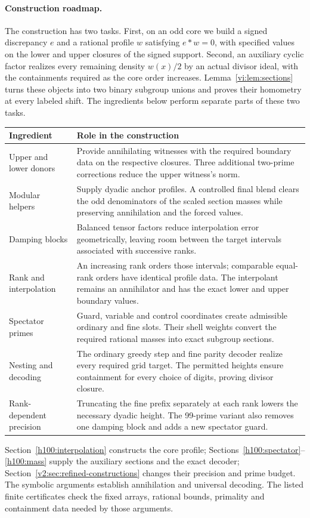 \documentclass[11pt]{article}
\numberwithin{equation}{section}
\theoremstyle{definition}
\theoremstyle{remark}
\begin{document}
\paragraph{Construction roadmap.}
The construction has two tasks. First, on an odd core we build a signed
discrepancy $e$ and a rational profile $w$ satisfying $e*w=0$, with
specified values on the lower and upper closures of the signed support.
Second, an auxiliary cyclic factor realizes every remaining density
$w(x)/2$ by an actual divisor ideal, with the containments required as the
core order increases. Lemma~\ref{vi:lem:sections} turns these objects into
two binary subgroup unions and proves their homometry at every labeled
shift. The ingredients below perform separate parts of these two tasks.
\begin{center}\small
\begin{tabular}{@{}>{\raggedright\arraybackslash}p{.23\linewidth}
                    >{\raggedright\arraybackslash}p{.69\linewidth}@{}}
\toprule
Ingredient & Role in the construction\\\midrule
Upper and lower donors &
Provide annihilating witnesses with the required boundary data on the
respective closures. Three additional two-prime corrections reduce the
upper witness's norm.\\[.35em]
Modular helpers &
Supply dyadic anchor profiles. A controlled final blend clears the odd
denominators of the scaled section masses while preserving annihilation
and the forced values.\\[.35em]
Damping blocks &
Balanced tensor factors reduce interpolation error geometrically, leaving
room between the target intervals associated with successive ranks.\\[.35em]
Rank and interpolation &
An increasing rank orders those intervals; comparable equal-rank orders
have identical profile data. The interpolant remains an annihilator and
has the exact lower and upper boundary values.\\[.35em]
Spectator primes &
Guard, variable and control coordinates create admissible ordinary and
fine slots. Their shell weights convert the required rational masses into
exact subgroup sections.\\[.35em]
Nesting and decoding &
The ordinary greedy step and fine parity decoder realize every required
grid target. The permitted heights ensure containment for every choice
of digits, proving divisor closure.\\[.35em]
Rank-dependent precision &
Truncating the fine prefix separately at each rank lowers the necessary
dyadic height. The 99-prime variant also removes one damping block and
adds a new spectator guard.\\
\bottomrule
\end{tabular}
\end{center}
Section~\ref{h100:interpolation} constructs the core profile;
Sections~\ref{h100:spectator}--\ref{h100:mass} supply the auxiliary
sections and the exact decoder; Section~\ref{v2:sec:refined-constructions}
changes their precision and prime budget. The symbolic arguments establish
annihilation and universal decoding. The listed finite certificates check
the fixed arrays, rational bounds, primality and containment data needed
by those arguments.
\end{document}
